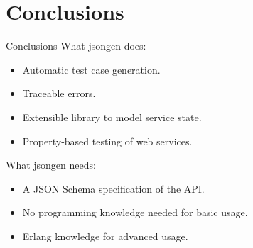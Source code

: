 \section{Conclusions}

\begin{frame}{Conclusions}
  What jsongen does:
\begin{itemize}
\item Automatic test case generation.
\item Traceable errors.
\item Extensible library to model service state.
\item Property-based testing of web services.
\end{itemize}

What jsongen needs:
  \begin{itemize}
    \item A JSON Schema specification of the API.
    \item No programming knowledge needed for basic usage.
    \item Erlang knowledge for advanced usage.
  \end{itemize}
\end{frame}
